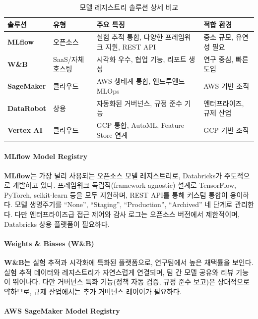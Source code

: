 \begin{table}[htbp]
\centering
\caption{모델 레지스트리 솔루션 상세 비교}
\label{tab:14_2}
\begin{tabularx}{\textwidth}{lp{2cm}Xp{3cm}}
\toprule
\textbf{솔루션} & \textbf{유형} & \textbf{주요 특징} & \textbf{적합 환경} \\
\midrule
\textbf{MLflow} & 오픈소스 & 실험 추적 통합, 다양한 프레임워크 지원, REST API\cite{zaharia2018accelerating} & 중소 규모, 유연성 필요 \\
\textbf{W\&B} & SaaS/자체호스팅 & 시각화 우수, 협업 기능, 리포트 생성 & 연구 중심, 빠른 도입 \\
\textbf{SageMaker} & 클라우드 & AWS 생태계 통합, 엔드투엔드 MLOps & AWS 기반 조직 \\
\textbf{DataRobot} & 상용 & 자동화된 거버넌스, 규정 준수 기능\cite{shankar2022operationalizing} & 엔터프라이즈, 규제 산업 \\
\textbf{Vertex AI} & 클라우드 & GCP 통합, AutoML, Feature Store 연계 & GCP 기반 조직 \\
\bottomrule
\end{tabularx}
\end{table}

\paragraph{MLflow Model Registry}

\textbf{MLflow}\cite{zaharia2018accelerating}는 가장 널리 사용되는 오픈소스 모델 레지스트리로, Databricks가 주도적으로 개발하고 있다. 프레임워크 독립적(framework-agnostic) 설계로 TensorFlow, PyTorch, scikit-learn 등을 모두 지원하며, REST API를 통해 커스텀 통합이 용이하다. 모델 생명주기를 ``None'', ``Staging'', ``Production'', ``Archived'' 네 단계로 관리한다. 다만 엔터프라이즈급 접근 제어와 감사 로그는 오픈소스 버전에서 제한적이며, Databricks 상용 플랫폼이 필요하다.

\paragraph{Weights \& Biases (W\&B)}

\textbf{W\&B}는 실험 추적과 시각화에 특화된 플랫폼으로, 연구팀에서 높은 채택률을 보인다. 실험 추적 데이터와 레지스트리가 자연스럽게 연결되며, 팀 간 모델 공유와 리뷰 기능이 뛰어나다. 다만 거버넌스 특화 기능(정책 자동 검증, 규정 준수 보고)은 상대적으로 약하므로, 규제 산업에서는 추가 거버넌스 레이어가 필요하다.

\paragraph{AWS SageMaker Model Registry}

